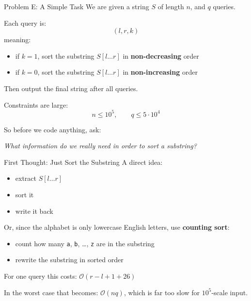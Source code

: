\documentclass[aspectratio=169]{beamer}
\begin{document}
\begin{frame}{Problem E: A Simple Task}
    We are given a string \(S\) of length \(n\), and \(q\) queries.

    Each query is:
    $$
    (l, r, k)
    $$
    meaning:
    \begin{itemize}
        \item if \(k = 1\), sort the substring \(S[l \dots r]\) in
        \textbf{non-decreasing} order
        \item if \(k = 0\), sort the substring \(S[l \dots r]\) in
        \textbf{non-increasing} order
    \end{itemize}

    Then output the final string after all queries.

    Constraints are large:
    \[
    n \le 10^5,\qquad q \le 5 \cdot 10^4
    \]

    So before we code anything, ask:
    \begin{center}
        \textit{What information do we really need in order to sort a
        substring?}
    \end{center}
\end{frame}

\begin{frame}{First Thought: Just Sort the Substring}
    A direct idea:
    \begin{itemize}
        \item extract \(S[l \dots r]\)
        \item sort it
        \item write it back
    \end{itemize}

    Or, since the alphabet is only lowercase English letters, use
    \textbf{counting sort}:
    \begin{itemize}
        \item count how many \texttt{a}, \texttt{b}, \dots, \texttt{z}
        are in the substring
        \item rewrite the substring in sorted order
    \end{itemize}

    For one query this costs: $\mathcal{O}(r-l+1 + 26)$

    In the worst case that becomes: $\mathcal{O}(nq)$, which is far too slow for \(10^5\)-scale input.
\end{frame}
\end{document}
